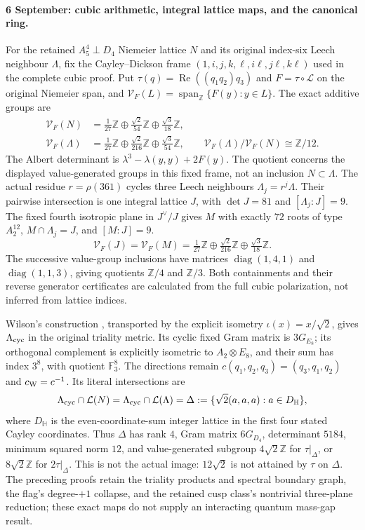 \paragraph{6 September: cubic arithmetic, integral lattice maps, and the canonical ring.}
For the retained $A_5^4\perp D_4$ Niemeier lattice $N$ and its
original index-six Leech neighbour $\Lambda$, fix the Cayley--Dickson
frame $(1,i,j,k,\ell,i\ell,j\ell,k\ell)$ used in the complete cubic
proof. Put $\tau(q)=\operatorname{Re}((q_1q_2)q_3)$ and
$F=\tau\circ\mathcal L$ on the original Niemeier span,
and $\mathcal V_F(L)=\operatorname{span}_{\mathbb Z}\{F(y):y\in L\}$.
The exact additive groups are
\[
\begin{aligned}
 \mathcal V_F(N)&=\tfrac1{27}\mathbb Z\oplus
       \tfrac{\sqrt2}{54}\mathbb Z\oplus\tfrac{\sqrt3}{18}\mathbb Z,\\
 \mathcal V_F(\Lambda)&=\tfrac1{27}\mathbb Z\oplus
       \tfrac{\sqrt2}{216}\mathbb Z\oplus\tfrac{\sqrt3}{54}\mathbb Z,
 \qquad \mathcal V_F(\Lambda)/\mathcal V_F(N)\cong\mathbb Z/12.
\end{aligned}
\]
The Albert determinant is $\lambda^3-\lambda(y,y)+2F(y)$.
The quotient concerns the displayed value-generated groups in this fixed
frame, not an inclusion $N\subset\Lambda$. The actual residue
$r=\rho(361)$ cycles three Leech neighbours $\Lambda_j=r^j\Lambda$.
Their pairwise intersection is one integral lattice $J$, with
$\det J=81$ and $[\Lambda_j:J]=9$. The fixed fourth isotropic plane
in $J^\vee/J$ gives $M$ with exactly $72$ roots of type $A_2^{12}$,
$M\cap\Lambda_j=J$, and $[M:J]=9$.
\[
 \mathcal V_F(J)=\mathcal V_F(M)
 =\tfrac1{27}\mathbb Z\oplus\tfrac{\sqrt2}{216}\mathbb Z
                         \oplus\tfrac{\sqrt3}{18}\mathbb Z.
\]
The successive value-group inclusions have matrices
$\operatorname{diag}(1,4,1)$ and $\operatorname{diag}(1,1,3)$,
giving quotients $\mathbb Z/4$ and $\mathbb Z/3$.
Both containments and their reverse generator certificates are calculated
from the full cubic polarization, not inferred from lattice indices.

Wilson's construction \cite{esn:Wilson2009}, transported by the explicit
isometry $\iota(x)=x/\sqrt2$, gives $\Lambda_{\rm cyc}$ in the
original triality metric. Its cyclic fixed Gram matrix is $3G_{E_8}$;
its orthogonal complement is explicitly isometric to $A_2\otimes E_8$,
and their sum has index $3^8$, with quotient $\mathbb F_3^8$.
The directions remain $c(q_1,q_2,q_3)=(q_3,q_1,q_2)$ and
$c_{\rm W}=c^{-1}$. Its literal intersections are
\[
 \Lambda_{\rm cyc}\cap\mathcal L(N)
 =\Lambda_{\rm cyc}\cap\mathcal L(\Lambda)
 =\Delta:=\{\sqrt2(a,a,a):a\in D_{\mathbb H}\},
\]
where $D_{\mathbb H}$ is the even-coordinate-sum integer lattice in
the first four stated Cayley coordinates. Thus $\Delta$ has rank $4$,
Gram matrix $6G_{D_4}$, determinant $5184$, minimum squared norm $12$,
and value-generated subgroup $4\sqrt2\mathbb Z$ for $\tau|_\Delta$, or
$8\sqrt2\mathbb Z$ for $2\tau|_\Delta$. This is not the actual image:
$12\sqrt2$ is not attained by $\tau$ on $\Delta$.
The preceding proofs retain the triality products and spectral boundary
graph, the flag's degree-$+1$ collapse, and the retained cusp class's
nontrivial three-plane reduction; these exact maps do not supply an
interacting quantum mass-gap result.

